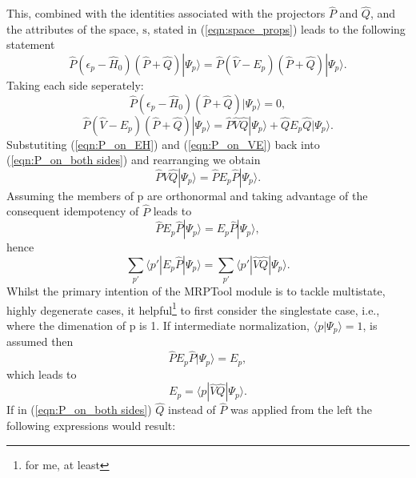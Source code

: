 \documentclass[12pt]{article}
\begin{document}
This, combined with the identities associated with the projectors $\hat{P}$ and $\hat{Q}$, and the
attributes of the space, $\mathrm{s}$, stated in (\ref{eqn:space_props}) leads to the following statement
\begin{equation}
\hat{P}(\epsilon_{p} - \hat{H}_{0})(\hat{P}+\hat{Q})| \Psi_{p} \rangle  =  \hat{P}(\hat{V}-E_{p})(\hat{P}+\hat{Q})|\Psi_{p} \rangle .
\label{eqn:P_on_both sides}
\end{equation}
Taking each side seperately:
\begin{equation}
\hat{P}(\epsilon_{p} - \hat{H}_{0})(\hat{P}+\hat{Q})| \Psi_{p} \rangle  = 0  ,
\label{eqn:P_on_EH}
\end{equation}
\begin{equation}
\hat{P}(\hat{V}-E_{p})(\hat{P}+\hat{Q})|\Psi_{p} \rangle = \hat{P}\hat{V}\hat{Q}|\Psi_{p} \rangle + \hat{Q}E_{p}\hat{Q}|\Psi_{p}\rangle .
\label{eqn:P_on_VE}
\end{equation}
Substutiting (\ref{eqn:P_on_EH}) and (\ref{eqn:P_on_VE}) back into (\ref{eqn:P_on_both sides}) and rearranging we obtain
\begin{equation}
\hat{P}\hat{V}\hat{Q}|\Psi_{p} \rangle =  \hat{P}E_{p}\hat{P}|\Psi_{p}\rangle .
\label{eqn:pt_energy}
\end{equation}
Assuming the members of $\mathrm{p}$ are orthonormal and taking advantage of the consequent idempotency of $\hat{P}$ leads to
\begin{equation}
\hat{P}E_{p}\hat{P}|\Psi_{p}\rangle = E_{p}\hat{P}|\Psi_{p} \rangle ,
\end{equation}
hence
\begin{equation}
\sum_{p'} \langle p' | E_{p}\hat{P}|\Psi_{p} \rangle  =  \sum_{p'} \langle p' | \hat{V}\hat{Q}|\Psi_{p} \rangle.
\label{eqn:multistate_pt_energy}
\end{equation}
Whilst the primary intention of the MRPTool module is to tackle multistate, highly degenerate cases, it helpful\footnote{for me, at least} 
to first consider the singlestate case, i.e., where the dimenation of $\mathrm{p}$ is 1. 
If intermediate normalization, $\langle p | \Psi_{p} \rangle = 1$, is assumed then 
\begin{equation}
\hat{P}E_{p}\hat{P}|\Psi_{p}\rangle = E_{p},
\end{equation}
which leads to 
\begin{equation}
E_{p} = \langle p | \hat{V}\hat{Q}|\Psi_{p} \rangle.
\label{eqn:singlestate_pt_energy}
\end{equation}
If in (\ref{eqn:P_on_both sides}) $\hat{Q}$ instead of $\hat{P}$ was applied from the left the following expressions would result:
\end{document}
